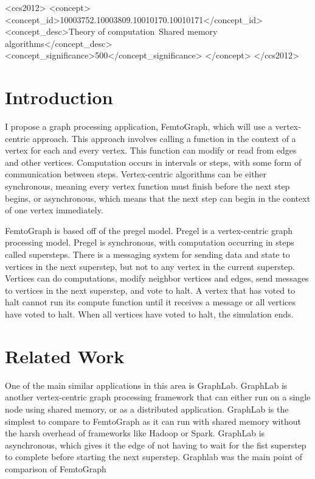 \documentclass{sig-alternate-05-2015}
\begin{document}
%
\begin{CCSXML}
  <ccs2012>
  <concept>
  <concept_id>10003752.10003809.10010170.10010171</concept_id>
  <concept_desc>Theory of computation~Shared memory algorithms</concept_desc>
  <concept_significance>500</concept_significance>
  </concept>
  </ccs2012>
\end{CCSXML}

%
%

%
%
\printccsdesc



\section{Introduction}
\justify
I propose a graph processing application, FemtoGraph, which will use a vertex-centric approach. This approach involves calling a function in the context of a vertex for each and every vertex. This function can modify or read from edges and other vertices.  Computation occurs in intervals or steps, with some form of communication between steps. Vertex-centric algorithms can be either synchronous, meaning every vertex function must finish before the next step begins, or asynchronous, which means that the next step can begin in the context of one vertex immediately.  \cite{Gz:7}

FemtoGraph is based off of the pregel model. Pregel is a vertex-centric graph processing model. Pregel is synchronous, with computation occurring in steps called supersteps. There is a messaging system for sending data and state to vertices in the next superstep, but not to any vertex in the current superstep. Vertices can do computations, modify neighbor vertices and edges, send messages to vertices in the next superstep, and vote to halt. A vertex that has voted to halt cannot run its compute function until it receives a message or all vertices have voted to halt. When all vertices have voted to halt, the simulation ends. \cite{Gz:4}

\section{Related Work}
\justify
One of the main similar applications in this area is GraphLab. GraphLab is another vertex-centric graph processing framework that can either run on a single node using shared memory, or as a distributed application. GraphLab is the simplest to compare to FemtoGraph as it can run with shared memory without the harsh overhead of frameworks like Hadoop or Spark. GraphLab is asynchronous, which gives it the edge of not having to wait for the fist superstep to complete before starting the next superstep. \cite{Gz:6} Graphlab was the main point of comparison of FemtoGraph 
\end{document}
